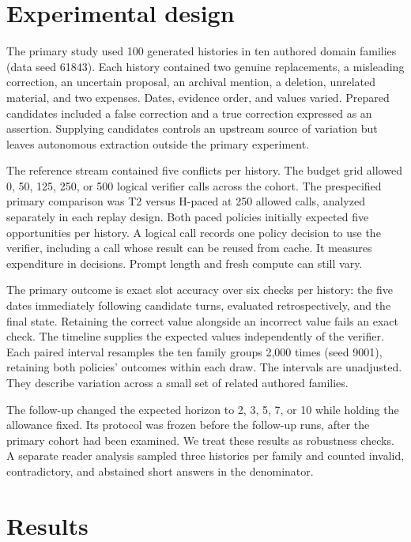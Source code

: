 \documentclass[
  11pt,
]{article}
\begin{document}
\section{Experimental design}\label{experimental-design}

The primary study used 100 generated histories in ten authored domain
families (data seed 61843). Each history contained two genuine
replacements, a misleading correction, an uncertain proposal, an
archival mention, a deletion, unrelated material, and two expenses.
Dates, evidence order, and values varied. Prepared candidates included a
false correction and a true correction expressed as an assertion.
Supplying candidates controls an upstream source of variation but leaves
autonomous extraction outside the primary experiment.

The reference stream contained five conflicts per history. The budget
grid allowed 0, 50, 125, 250, or 500 logical verifier calls across the
cohort. The prespecified primary comparison was T2 versus H-paced at 250
allowed calls, analyzed separately in each replay design. Both paced
policies initially expected five opportunities per history. A logical
call records one policy decision to use the verifier, including a call
whose result can be reused from cache. It measures expenditure in
decisions. Prompt length and fresh compute can still vary.

The primary outcome is exact slot accuracy over six checks per history:
the five dates immediately following candidate turns, evaluated
retrospectively, and the final state. Retaining the correct value
alongside an incorrect value fails an exact check. The timeline supplies
the expected values independently of the verifier. Each paired interval
resamples the ten family groups 2,000 times (seed 9001), retaining both
policies' outcomes within each draw. The intervals are unadjusted. They
describe variation across a small set of related authored families.

The follow-up changed the expected horizon to 2, 3, 5, 7, or 10 while
holding the allowance fixed. Its protocol was frozen before the
follow-up runs, after the primary cohort had been examined. We treat
these results as robustness checks. A separate reader analysis sampled
three histories per family and counted invalid, contradictory, and
abstained short answers in the denominator.

\section{Results}\label{results}
\end{document}
